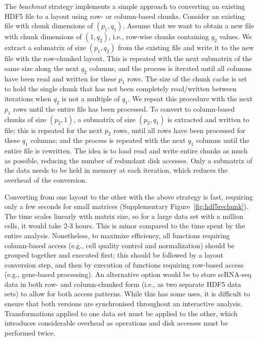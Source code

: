 \documentclass{article}
\newcommand{\beachmat}{\textit{beachmat}}
\begin{document}
The \beachmat{} strategy implements a simple approach to converting an existing HDF5 file to a layout using row- or column-based chunks.
Consider an existing file with chunk dimensions of $(p_1, q_1)$. 
Assume that we want to obtain a new file with chunk dimensions of $(1, q_2)$, i.e., row-wise chunks containing $q_2$ values.
We extract a submatrix of size $(p_1, q_2)$ from the existing file and write it to the new file with the row-chunked layout.
This is repeated with the next submatrix of the same size along the next $q_2$ columns, and the process is iterated until all columns have been read and written for these $p_1$ rows.
The size of the chunk cache is set to hold the single chunk that has not been completely read/written between iterations when $q_2$ is not a multiple of $q_1$.
We repeat this procedure with the next $p_1$ rows until the entire file has been processed.
To convert to column-based chunks of size $(p_2, 1)$, a submatrix of size $(p_2, q_1)$ is extracted and written to file; this is repeated for the next $p_2$ rows, until all rows have been processed for these $q_1$ columns; and the process is repeated with the next $q_1$ columns until the entire file is rewritten.
The idea is to load read and write entire chunks as much as possible, reducing the number of redundant disk accesses.
Only a submatrix of the data needs to be held in memory at each iteration, which reduces the overhead of the conversion.

Converting from one layout to the other with the above strategy is fast, requiring only a few seconds for small matrices (Supplementary Figure~\ref{fig:hdf5rechunk}).
The time scales linearly with matrix size, so for a large data set with a million cells, it would take 2-3 hours.
This is minor compared to the time spent by the entire analysis.
Nonetheless, to maximize efficiency, all functions requiring column-based access (e.g., cell quality control and normalization) should be grouped together and executed first; 
this should be followed by a layout conversion step, and then by execution of functions requiring row-based access (e.g., gene-based processing).
An alternative option would be to store scRNA-seq data in both row- and column-chunked form (i.e., as two separate HDF5 data sets) to allow for both access patterns.
While this has some uses, it is difficult to ensure that both versions are synchronised throughout an interactive analysis.
Transformations applied to one data set must be applied to the other, which introduces considerable overhead as operations and disk accesses must be performed twice.
\end{document}
